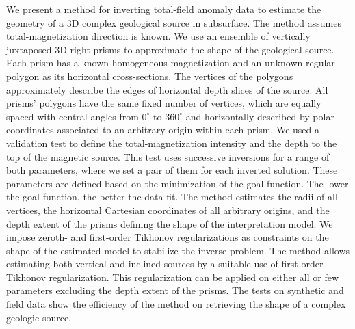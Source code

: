 \begin{summary}
We present a method for inverting total-field anomaly data to estimate the geometry of a 3D complex geological source in subsurface. The method assumes total-magnetization direction is known. We use an ensemble of vertically juxtaposed 3D right prisms to approximate the shape of the geological source. Each prism has a known homogeneous magnetization and an unknown regular polygon as its horizontal cross-sections. The vertices of the polygons approximately describe the edges of horizontal depth slices of the source. All prisms’ polygons have the same fixed number of vertices, which are equally spaced with central angles from $0^{\circ}$ to $360^{\circ}$ and horizontally described by polar coordinates associated to an arbitrary origin within each prism. We used a validation test to define the total-magnetization intensity and the depth to the top of the magnetic source. This test uses successive inversions for a range of both parameters, where we set a pair of them for each inverted solution. These parameters are defined based on the minimization of the goal function. The lower the goal function, the better the data fit. The method estimates the radii of all vertices, the horizontal Cartesian coordinates of all arbitrary origins, and the depth extent of the prisms defining the shape of the interpretation model. We impose zeroth- and first-order Tikhonov regularizations as constraints on the shape of the estimated model to stabilize the inverse problem. The method allows estimating both vertical and inclined sources by a suitable use of first-order Tikhonov regularization. This regularization can be applied on either all or few parameters excluding the depth extent of the prisms. The tests on synthetic and field data show the efficiency of the method on retrieving the shape of a complex geologic source.
\end{summary}